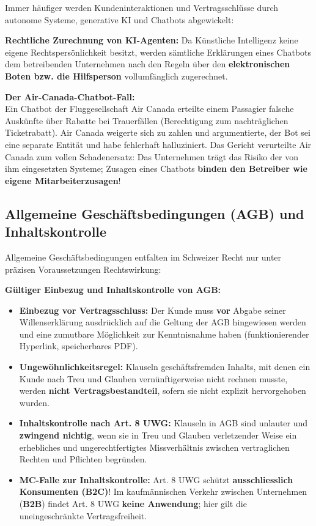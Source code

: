 Immer häufiger werden Kundeninteraktionen und Vertragsschlüsse durch autonome Systeme, generative KI und Chatbots abgewickelt:

\begin{definition}
    \textbf{Rechtliche Zurechnung von KI-Agenten:}
    Da Künstliche Intelligenz keine eigene Rechtspersönlichkeit besitzt, werden sämtliche Erklärungen eines Chatbots dem betreibenden Unternehmen nach den Regeln über den \textbf{elektronischen Boten bzw. die Hilfsperson} vollumfänglich zugerechnet.
\end{definition}

\begin{example}
    \textbf{Der Air-Canada-Chatbot-Fall:} \\
    Ein Chatbot der Fluggesellschaft Air Canada erteilte einem Passagier falsche Auskünfte über Rabatte bei Trauerfällen (Berechtigung zum nachträglichen Ticketrabatt). Air Canada weigerte sich zu zahlen und argumentierte, der Bot sei eine separate Entität und habe fehlerhaft halluziniert. Das Gericht verurteilte Air Canada zum vollen Schadenersatz: Das Unternehmen trägt das Risiko der von ihm eingesetzten Systeme; Zusagen eines Chatbots \textbf{binden den Betreiber wie eigene Mitarbeiterzusagen}!
\end{example}

\subsection{Allgemeine Geschäftsbedingungen (AGB) und Inhaltskontrolle}

Allgemeine Geschäftsbedingungen entfalten im Schweizer Recht nur unter präzisen Voraussetzungen Rechtswirkung:

\begin{theorem}
    \textbf{Gültiger Einbezug und Inhaltskontrolle von AGB:}
    \begin{itemize}
        \item \textbf{Einbezug vor Vertragsschluss:} Der Kunde muss \textbf{vor} Abgabe seiner Willenserklärung ausdrücklich auf die Geltung der AGB hingewiesen werden und eine zumutbare Möglichkeit zur Kenntnisnahme haben (funktionierender Hyperlink, speicherbares PDF).
        \item \textbf{Ungewöhnlichkeitsregel:} Klauseln geschäftsfremden Inhalts, mit denen ein Kunde nach Treu und Glauben vernünftigerweise nicht rechnen musste, werden \textbf{nicht Vertragsbestandteil}, sofern sie nicht explizit hervorgehoben wurden.
        \item \textbf{Inhaltskontrolle nach Art. 8 UWG:} Klauseln in AGB sind unlauter und \textbf{zwingend nichtig}, wenn sie in Treu und Glauben verletzender Weise ein erhebliches und ungerechtfertigtes Missverhältnis zwischen vertraglichen Rechten und Pflichten begründen.
        \item \textbf{MC-Falle zur Inhaltskontrolle:} Art. 8 UWG schützt \textbf{ausschliesslich Konsumenten (B2C)}! Im kaufmännischen Verkehr zwischen Unternehmen (\textbf{B2B}) findet Art. 8 UWG \textbf{keine Anwendung}; hier gilt die uneingeschränkte Vertragsfreiheit.
    \end{itemize}
\end{theorem}

